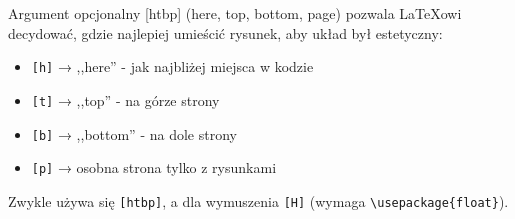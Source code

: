 \begin{tcolorbox}[blue,title={Hinweis}]
Argument opcjonalny [htbp] (here, top, bottom, page) pozwala LaTeXowi decydować, gdzie najlepiej umieścić rysunek, aby układ był estetyczny:
    \begin{itemize}
        \setlength\topsep{0em}      
        \setlength\itemsep{0.2em}   %
        \setlength\parskip{0pt}     %
        \setlength\parsep{0pt}
        
        \item \texttt{[h]} → ,,here'' - jak najbliżej miejsca w kodzie
        \item \texttt{[t]} → ,,top'' - na górze strony
        \item \texttt{[b]} → ,,bottom'' - na dole strony
        \item \texttt{[p]} → osobna strona tylko z rysunkami
    \end{itemize}
Zwykle używa się \texttt{[htbp]}, a dla wymuszenia \texttt{[H]} (wymaga \texttt{\textbackslash usepackage\{float\}}).

\end{tcolorbox}
